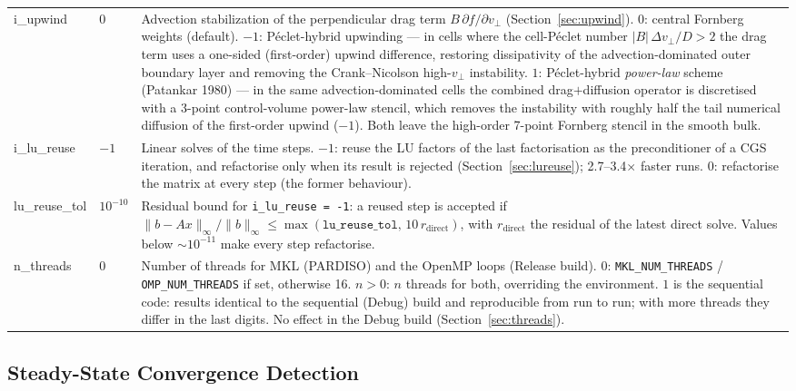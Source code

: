 \documentclass[11pt,a4paper]{article}
\newcommand{\vp}{v_\perp}
\begin{document}
\begin{longtable}{>{\ttfamily}p{3.2cm} p{1.5cm} p{9cm}}
i\_upwind & $0$ &
  Advection stabilization of the perpendicular drag term $B\,\partial f/\partial\vp$
  (Section~\ref{sec:upwind}).
  $0$: central Fornberg weights (default).
  $-1$: P\'eclet-hybrid upwinding --- in cells where the cell-P\'eclet number
  $|B|\,\Delta\vp/D > 2$ the drag term uses a one-sided (first-order) upwind
  difference, restoring dissipativity of the advection-dominated outer boundary
  layer and removing the Crank--Nicolson high-$\vp$ instability.
  $1$: P\'eclet-hybrid \emph{power-law} scheme (Patankar 1980) --- in the same
  advection-dominated cells the combined drag$+$diffusion operator is
  discretised with a 3-point control-volume power-law stencil, which removes the
  instability with roughly half the tail numerical diffusion of the first-order
  upwind ($-1$).  Both leave the high-order 7-point Fornberg stencil in the
  smooth bulk. \\[4pt]

i\_lu\_reuse & $-1$ &
  Linear solves of the time steps.
  $-1$: reuse the LU factors of the last factorisation as the preconditioner of a
  CGS iteration, and refactorise only when its result is rejected
  (Section~\ref{sec:lureuse}); 2.7--3.4$\times$ faster runs.
  $0$: refactorise the matrix at every step (the former behaviour). \\[4pt]

lu\_reuse\_tol & $10^{-10}$ &
  Residual bound for \texttt{i\_lu\_reuse = -1}: a reused step is accepted if
  $\|b - A x\|_\infty/\|b\|_\infty \le \max(\texttt{lu\_reuse\_tol},\,
  10\,r_\mathrm{direct})$, with $r_\mathrm{direct}$ the residual of the latest
  direct solve.  Values below ${\sim}10^{-11}$ make every step refactorise. \\[4pt]

n\_threads & $0$ &
  Number of threads for MKL (PARDISO) and the OpenMP loops (Release build).
  $0$: \texttt{MKL\_NUM\_THREADS} / \texttt{OMP\_NUM\_THREADS} if set, otherwise
  16.  $n>0$: $n$ threads for both, overriding the environment.  $1$ is the
  sequential code: results identical to the sequential (Debug) build and
  reproducible from run to run; with more threads they differ in the last
  digits.  No effect in the Debug build (Section~\ref{sec:threads}). \\[4pt]

\end{longtable}

\subsection{Steady-State Convergence Detection}
\end{document}
